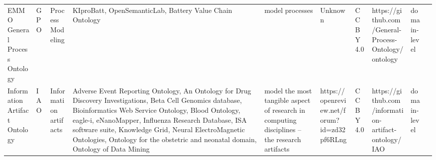 \begin{tabular}{llllllllll}
                                                    EMMO General Process Ontology &                     GPO &                            Process Modeling &                                                                                                                                                                                                                                                                                                             KIproBatt, OpenSemanticLab, Battery Value Chain Ontology &                                                                                                                                                                                                                                                                                                                                                                                        model processes &                                                                                                            Unknown &                                    CC BY 4.0 &                                              https://github.com/General-Process-Ontology/ontology  &      domain-level \\
                                                    Information Artifact Ontology &                     IAO &                       Information artifacts & Adverse Event Reporting Ontology, An Ontology for Drug Discovery Investigations, Beta Cell Genomics database, Bioinformatics Web Service Ontology, Blood Ontology, eagle-i, eNanoMapper, Influenza Research Database, ISA software suite, Knowledge Grid, Neural ElectroMagnetic Ontologies, Ontology for the obstetric and neonatal domain, Ontology of Data Mining &                                                                                                                                                                                                                                                                                                           model the most tangible aspect of research in computing disciplines – the research artifacts &                                                                        https://openreview.net/forum?id=zd32pf6RLng &                                    CC BY 4.0 &                                               https://github.com/information-artifact-ontology/IAO &      domain-level \\

\end{tabular}

